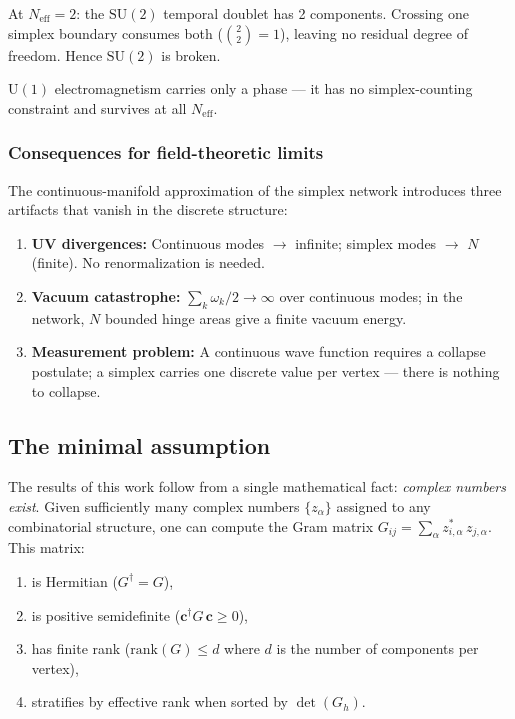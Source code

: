 At $N_\text{eff} = 2$: the $\text{SU}(2)$ temporal doublet has 2 components. Crossing one simplex boundary consumes both ($\binom{2}{2} = 1$), leaving no residual degree of freedom. Hence $\text{SU}(2)$ is broken.

$\text{U}(1)$ electromagnetism carries only a phase --- it has no simplex-counting constraint and survives at all $N_\text{eff}$.

\subsubsection{Consequences for field-theoretic limits}

The continuous-manifold approximation of the simplex network introduces three artifacts that vanish in the discrete structure:

\begin{enumerate}
\item \textbf{UV divergences:} Continuous modes $\to$ infinite; simplex modes $\to$ $N$ (finite). No renormalization is needed.
\item \textbf{Vacuum catastrophe:} $\sum_k \omega_k/2 \to \infty$ over continuous modes; in the network, $N$ bounded hinge areas give a finite vacuum energy.
\item \textbf{Measurement problem:} A continuous wave function requires a collapse postulate; a simplex carries one discrete value per vertex --- there is nothing to collapse.
\end{enumerate}

\subsection{The minimal assumption}

The results of this work follow from a single mathematical fact: \emph{complex numbers exist}. Given sufficiently many complex numbers $\{z_\alpha\}$ assigned to any combinatorial structure, one can compute the Gram matrix $G_{ij} = \sum_\alpha z^*_{i,\alpha}\,z_{j,\alpha}$. This matrix:
\begin{enumerate}
\item is Hermitian ($G^\dagger = G$),
\item is positive semidefinite ($\mathbf{c}^\dagger G\,\mathbf{c} \geq 0$),
\item has finite rank ($\text{rank}(G) \leq d$ where $d$ is the number of components per vertex),
\item stratifies by effective rank when sorted by $\det(G_h)$.
\end{enumerate}

